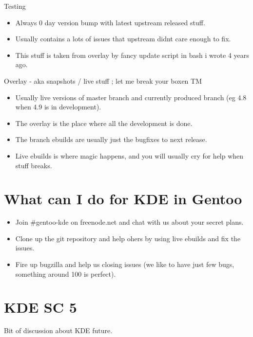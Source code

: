 \documentclass{beamer}
\begin{document}
\begin{frame}
	\begin{center}Testing\end{center}
	\begin{itemize}
		\item Always 0 day version bump with latest upstream released stuff.
		\item Usually contains a lots of issues that upstream didnt care enough to fix.
		\item This stuff is taken from overlay by fancy update script in bash i wrote 4 years ago.
	\end{itemize}
\end{frame}

\begin{frame}
	Overlay - aka snapshots / live stuff ; let me break your boxen TM
	\begin{itemize}
		\item Usually live versions of master branch and currently produced branch (eg 4.8 when 4.9 is in development).
		\item The overlay is the place where all the development is done.
		\item The branch ebuilds are usually just the bugfixes to next release.
		\item Live ebuilds is where magic happens, and you will usually cry for help when stuff breaks.
	\end{itemize}
\end{frame}

\section{What can I do for KDE in Gentoo}
\begin{frame}
	\begin{itemize}
		\item Join #gentoo-kde on freenode.net and chat with us about your secret plans.
		\item Clone up the git repository and help ohers by using live ebuilds and fix the issues.
		\item Fire up bugzilla and help us closing issues (we like to have just few bugs, something around 100 is perfect).
	\end{itemize}
\end{frame}

\section{KDE SC 5}
\begin{frame}
	\begin{center}Bit of discussion about KDE future.\end{center}
\end{frame}
\end{document}
